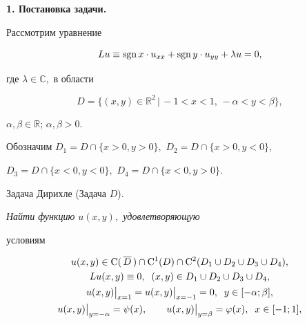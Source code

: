 \makerutitle











{\bf 1. Постановка задачи.}

Рассмотрим уравнение

\begin{equation}

Lu\equiv \mathop{\rm sgn} x \cdot  u_{xx}+\mathop{\rm sgn} y \cdot  u_{yy}+\lambda u=0,

\label{gim:eq-uravn1}

\end{equation}

где $\lambda\in \mathbb{C},$ в  области 

$$D=\{(x,y)\in \mathbb{R}^2\,|\,-1< x< 1,\,-\alpha< y< \beta\},$$ 

$\alpha,\beta\in \mathbb{R}$; $\alpha,\beta>0.$

Обозначим $D_1=D\cap\{x>0,y>0\},$ $D_2=D\cap\{x>0,y<0\},$

$D_3=D\cap\{x<0, y<0\},$ $D_4=D\cap\{x<0, y>0\}.$



\smallskip



{\small \sc Задача Дирихле (Задача $D$).} 

{\it Найти функцию $u(x,y),$ удовлетворяющую

условиям}

\begin{gather}

u(x,y)\in {\rm C}(\,\overline D\,)\cap {\rm C}^1(D)\cap {\rm C}^2

(D_1\cup D_2\cup D_3\cup D_4),\label{gim:eq-u2}\\

Lu(x,y)\equiv 0,\;\;(x,y)\in D_1\cup D_2\cup D_3\cup D_4,\label{gim:eq-u5}\\

u(x,y)\big|_{x=1}=u(x,y)\big|_{x=-1}=0,\;\;y\in [-\alpha;\beta],\label{gim:eq-u5}\\

u(x,y)\big|_{y=-\alpha}=\psi(x),\qquad u(x,y)\big|_{y=\beta}=\varphi(x),\;\;x\in [-1;1],\label{gim:eq-u5}

\end{gather}

